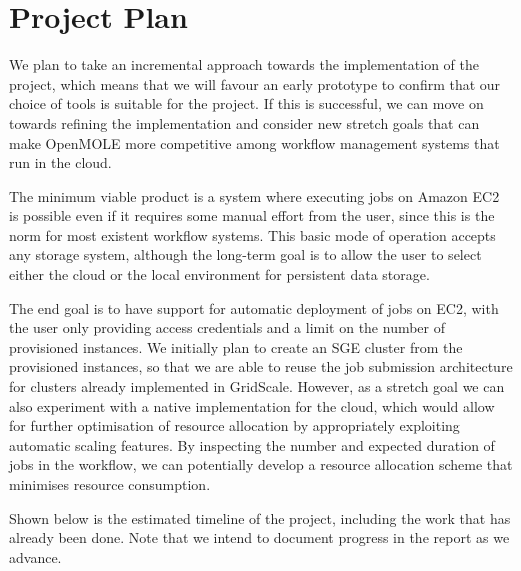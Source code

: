 \chapter{Project Plan}

We plan to take an incremental approach towards the implementation of the project, which means that we will favour an early prototype to confirm that our choice of tools is suitable for the project. If this is successful, we can move on towards refining the implementation and consider new stretch goals that can make OpenMOLE more competitive among workflow management systems that run in the cloud.

The minimum viable product is a system where executing jobs on Amazon EC2 is possible even if it requires some manual effort from the user, since this is the norm for most existent workflow systems. This basic mode of operation accepts any storage system, although the long-term goal is to allow the user to select either the cloud or the local environment for persistent data storage.

The end goal is to have support for automatic deployment of jobs on EC2, with the user only providing access credentials and a limit on the number of provisioned instances. We initially plan to create an SGE cluster from the provisioned instances, so that we are able to reuse the job submission architecture for clusters already implemented in GridScale. However, as a stretch goal we can also experiment with a native implementation for the cloud, which would allow for further optimisation of resource allocation by appropriately exploiting automatic scaling features. By inspecting the number and expected duration of jobs in the workflow, we can potentially develop a resource allocation scheme that minimises resource consumption.

Shown below is the estimated timeline of the project, including the work that has already been done. Note that we intend to document progress in the report as we advance.

